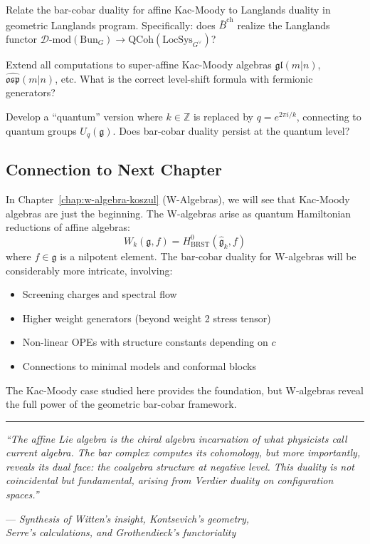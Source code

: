 \begin{openproblem}[4]
Relate the bar-cobar duality for affine Kac-Moody to Langlands duality in geometric Langlands program. Specifically: does $\bar{B}^{\text{ch}}$ realize the Langlands functor $\mathscr{D}\text{-mod}(\text{Bun}_G) \to \text{QCoh}(\text{LocSys}_{G^\vee})$?
\end{openproblem}

\begin{openproblem}[5]
Extend all computations to super-affine Kac-Moody algebras $\widehat{\mathfrak{gl}}(m|n)$, $\widehat{\mathfrak{osp}}(m|n)$, etc. What is the correct level-shift formula with fermionic generators?
\end{openproblem}

\begin{openproblem}[6]
Develop a ``quantum'' version where $k \in \mathbb{Z}$ is replaced by $q = e^{2\pi i/k}$, connecting to quantum groups $U_q(\mathfrak{g})$. Does bar-cobar duality persist at the quantum level?
\end{openproblem}

\subsection{Connection to Next Chapter}

In Chapter~\ref{chap:w-algebra-koszul} (W-Algebras), we will see that Kac-Moody algebras are just the beginning. The W-algebras arise as quantum Hamiltonian reductions of affine algebras:
$$W_k(\mathfrak{g}, f) = H^0_{\text{BRST}}(\widehat{\mathfrak{g}}_k, f)$$
where $f \in \mathfrak{g}$ is a nilpotent element. The bar-cobar duality for W-algebras will be considerably more intricate, involving:
\begin{itemize}
\item Screening charges and spectral flow
\item Higher weight generators (beyond weight 2 stress tensor)
\item Non-linear OPEs with structure constants depending on $c$
\item Connections to minimal models and conformal blocks
\end{itemize}

The Kac-Moody case studied here provides the foundation, but W-algebras reveal the full power of the geometric bar-cobar framework.

\bigskip

\begin{center}
\rule{0.5\textwidth}{0.4pt}

\textit{``The affine Lie algebra is the chiral algebra incarnation of what physicists call current algebra. The bar complex computes its cohomology, but more importantly, reveals its dual face: the coalgebra structure at negative level. This duality is not coincidental but fundamental, arising from Verdier duality on configuration spaces.''} 

— \textit{Synthesis of Witten's insight, Kontsevich's geometry, \\Serre's calculations, and Grothendieck's functoriality}
\end{center}